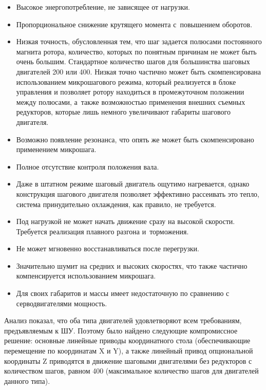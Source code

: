 \begin{itemize}
	\item Высокое энергопотребление, не зависящее от нагрузки.
	
	\item Пропорциональное снижение крутящего момента с~повышением оборотов.
	
	\item Низкая точность, обусловленная тем, что шаг задается полюсами постоянного магнита ротора, количество, которых по понятным причинам не может быть очень большим. Стандартное количество шагов для большинства шаговых двигателей 200 или 400. Низкая точно частично может быть скомпенсирована использованием микрошагового режима, который реализуется в блоке управления и позволяет ротору находиться в промежуточном положении между полюсами, а~также возможностью применения внешних съемных редукторов, которые лишь немного увеличивают габариты шагового двигателя.
	
	\item Возможно появление резонанса, что опять же может быть скомпенсировано применением микрошага.
	
	\item Полное отсутствие контроля положения вала.
	
	\item Даже в штатном режиме шаговый двигатель ощутимо нагревается, однако конструкция шагового двигателя позволяет эффективно рассеивать это тепло, система принудительно охлаждения, как правило, не требуется.
	
	\item Под нагрузкой не может начать движение сразу на высокой скорости. Требуется реализация плавного разгона и~торможения.
	
	\item Не может мгновенно восстанавливаться после перегрузки.
	
	\item Значительно шумит на средних и высоких скоростях, что также частично компенсируется использованием микрошага.
	
	\item Для своих габаритов и массы имеет недостаточную по сравнению с серводвигателями мощность.
\end{itemize}

Анализ показал, что оба типа двигателей удовлетворяют всем требованиям, предъявляемым к ШУ. Поэтому было найдено следующие компромиссное решение: основные линейные приводы координатного стола (обеспечивающие перемещение по координатам X и Y), а также линейный привод опциональной координаты Z приводятся в движение шаговыми двигателями без редукторов с количеством шагов, равном 400 (максимальное количество шагов для двигателей данного типа).

